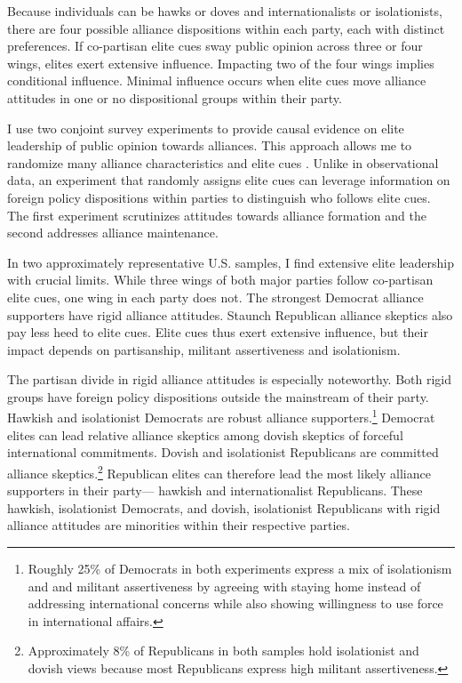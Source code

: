 \documentclass[12pt]{article}
\begin{document}
Because individuals can be hawks or doves and internationalists or isolationists, there are four possible alliance dispositions within each party, each with distinct preferences. 
If co-partisan elite cues sway public opinion across three or four wings, elites exert extensive influence. 
Impacting two of the four wings implies conditional influence. 
Minimal influence occurs when elite cues move alliance attitudes in one or no dispositional groups within their party.


I use two conjoint survey experiments to provide causal evidence on elite leadership of public opinion towards alliances.
This approach allows me to randomize many alliance characteristics and elite cues \citep{Hainmuelleretal2014}.
Unlike in observational data, an experiment that randomly assigns elite cues can leverage information on foreign policy dispositions within parties to distinguish who follows elite cues. 
The first experiment scrutinizes attitudes towards alliance formation and the second addresses alliance maintenance. 


In two approximately representative U.S. samples, I find extensive elite leadership with crucial limits. 
While three wings of both major parties follow co-partisan elite cues, one wing in each party does not.
The strongest Democrat alliance supporters have rigid alliance attitudes.
Staunch Republican alliance skeptics also pay less heed to elite cues. 
Elite cues thus exert extensive influence, but their impact depends on partisanship, militant assertiveness and isolationism.


The partisan divide in rigid alliance attitudes is especially noteworthy.
Both rigid groups have foreign policy dispositions outside the mainstream of their party. 
Hawkish and isolationist Democrats are robust alliance supporters.\footnote{Roughly 25\% of Democrats in both experiments express a mix of isolationism and and militant assertiveness by agreeing with staying home instead of addressing international concerns while also showing willingness to use force in international affairs.}
Democrat elites can lead relative alliance skeptics among dovish skeptics of forceful international commitments.
Dovish and isolationist Republicans are committed alliance skeptics.\footnote{Approximately 8\% of Republicans in both samples hold isolationist and dovish views because most Republicans express high militant assertiveness.} 
Republican elites can therefore lead the most likely alliance supporters in their party--- hawkish and internationalist Republicans.
These hawkish, isolationist Democrats, and dovish, isolationist Republicans with rigid alliance attitudes are minorities within their respective parties. 
\end{document}

